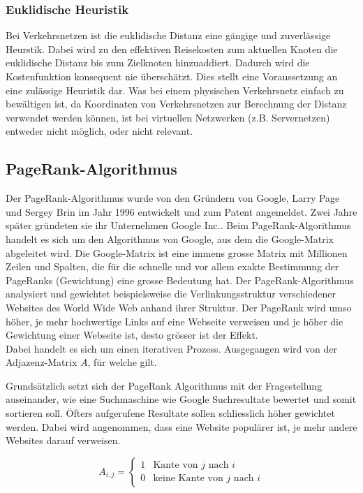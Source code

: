 \subsubsection{Euklidische Heuristik}
Bei Verkehrsnetzen ist die euklidische Distanz eine gängige und zuverlässige Heurstik. Dabei wird zu den effektiven Reisekosten zum aktuellen Knoten die euklidische Distanz bis zum Zielknoten hinzuaddiert. Dadurch wird die Kostenfunktion konsequent nie überschätzt. Dies stellt eine Voraussetzung an eine zulässige Heuristik dar.
Was bei einem physischen Verkehrsnetz einfach zu bewältigen ist, da Koordinaten von Verkehrsnetzen zur Berechnung der Distanz verwendet werden können, ist bei virtuellen Netzwerken (z.B. Servernetzen) entweder nicht möglich, oder nicht relevant.

\subsection{PageRank-Algorithmus}
Der PageRank-Algorithmus wurde von den Gründern von Google, Larry Page und Sergey Brin im Jahr 1996 entwickelt und zum Patent angemeldet. Zwei Jahre später gründeten sie ihr Unternehmen Google Inc..
Beim PageRank-Algorithmus handelt es sich um den Algorithmus von Google, aus dem die Google-Matrix abgeleitet wird.
Die Google-Matrix ist eine immens grosse Matrix mit Millionen Zeilen und Spalten, die für die schnelle und vor allem exakte Bestimmung der PageRanks (Gewichtung) eine grosse Bedeutung hat.
Der PageRank-Algorithmus analysiert und gewichtet beispielsweise die Verlinkungsstruktur verschiedener Websites des World Wide Web anhand ihrer Struktur.
Der PageRank wird umso höher, je mehr hochwertige Links auf eine Webseite verweisen und je höher die Gewichtung einer Webseite ist, desto grösser ist der Effekt.\\
Dabei handelt es sich um einen iterativen Prozess. Ausgegangen wird von der Adjazenz-Matrix $A$, für welche gilt.

Grundsätzlich setzt sich der PageRank Algorithmus mit der Fragestellung auseinander, wie eine Suchmaschine wie Google Suchresultate bewertet und somit sortieren soll. Öfters aufgerufene Resultate sollen schliesslich höher gewichtet werden. Dabei wird angenommen, dass eine Website populärer ist, je mehr andere Websites darauf verweisen.

\begin{equation}
A_{i,j}=\left\{ \begin{matrix}
1 & \text{Kante von $j$ nach $i$} \\ 0 & \text{keine Kante von $j$ nach $i$}
\end{matrix}
 \right.
\label{verkehr:Adja}
\end{equation}


